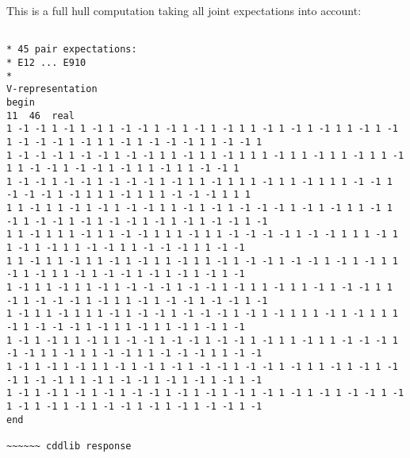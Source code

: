 \documentclass[%
 showpacs,
 showkeys,
 preprintnumbers,
 amsmath,amssymb,
 aps,
  pra,
  longbibliography,
 floatfix,
 ]{revtex4-1}
\begin{document}
This is a full hull computation taking all joint expectations into account:


{\footnotesize \begin{lstlisting}[backgroundcolor=\color{yellow!10},framerule=0pt,breaklines=true, frame=tb]

* 45 pair expectations:
* E12 ... E910
*
V-representation
begin
11  46  real
1 -1 -1 1 -1 1 -1 1 -1 -1 1 -1 1 -1 1 -1 1 1 -1 1 -1 1 -1 1 1 -1 1 -1 1 -1 -1 -1 1 -1 1 1 -1 1 -1 -1 -1 1 1 -1 -1 1
1 -1 -1 -1 1 -1 -1 1 -1 -1 1 1 -1 1 1 -1 1 1 1 -1 1 1 -1 1 1 -1 1 1 -1 1 1 -1 -1 1 -1 -1 1 -1 1 1 -1 1 1 -1 -1 1
1 -1 -1 1 -1 -1 1 -1 -1 -1 1 -1 1 1 -1 1 1 1 -1 1 1 -1 1 1 1 -1 -1 1 -1 -1 -1 1 -1 1 1 1 -1 1 1 1 -1 -1 -1 1 1 1
1 1 -1 1 1 -1 1 -1 1 -1 -1 1 1 -1 1 -1 1 -1 -1 -1 1 -1 1 -1 1 1 -1 1 -1 1 -1 -1 1 -1 1 -1 -1 1 -1 1 -1 1 -1 -1 1 -1
1 1 -1 1 1 1 -1 1 1 -1 -1 1 1 1 -1 1 1 -1 -1 -1 -1 1 -1 -1 1 1 1 -1 1 1 -1 1 -1 1 1 -1 -1 1 1 -1 -1 -1 1 1 -1 -1
1 1 -1 1 1 -1 1 1 -1 1 -1 1 1 -1 1 1 -1 1 -1 -1 1 -1 -1 1 -1 1 -1 1 1 -1 1 -1 1 1 -1 1 -1 -1 1 -1 1 -1 1 -1 1 -1
1 -1 1 1 -1 1 1 -1 1 -1 -1 -1 1 -1 -1 1 -1 1 1 -1 1 1 -1 1 -1 -1 1 1 -1 1 -1 -1 -1 1 -1 1 1 -1 1 -1 -1 1 -1 -1 1 -1
1 -1 1 1 -1 1 1 1 -1 1 -1 -1 1 -1 -1 -1 1 -1 1 -1 1 1 1 -1 1 -1 1 1 1 -1 1 -1 -1 -1 1 -1 1 1 -1 1 1 -1 1 -1 1 -1
1 -1 1 -1 1 1 -1 1 1 -1 -1 1 -1 -1 1 -1 -1 1 -1 1 1 -1 1 1 -1 -1 -1 1 -1 -1 1 1 -1 1 1 -1 -1 1 1 -1 -1 -1 1 1 -1 -1
1 -1 1 -1 1 -1 1 1 -1 1 -1 1 -1 1 -1 -1 1 -1 -1 1 -1 1 1 -1 1 -1 1 -1 -1 1 -1 -1 1 1 -1 1 -1 -1 1 -1 1 -1 1 -1 1 -1
1 -1 1 -1 1 -1 1 -1 1 -1 -1 1 -1 1 -1 1 -1 1 -1 1 -1 1 -1 1 -1 -1 1 -1 1 -1 1 -1 1 -1 1 -1 -1 1 -1 1 -1 1 -1 -1 1 -1
end

~~~~~~ cddlib response


\end{lstlisting}}
\end{document}
